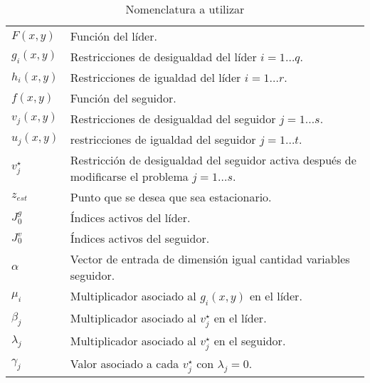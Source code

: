 \begin{table}[H]
    \centering
    \caption{Nomenclatura a utilizar}
    \begin{tabular}{l m{360pt}}
        $F(x,y)$              & Función del líder.                                                                                                          \\
        $ g_i(x,y) $              & Restricciones de desigualdad del líder   $ i=1\ldots q$.                                                                                                        \\
        $ h_i(x,y) $                 & Restricciones de igualdad del líder   $ i=1\ldots r$.                    \\
        $ f(x,y) $           & Función del seguidor.                                                               \\
        $ v_j(x,y) $              &  Restricciones de desigualdad del seguidor $j=1\ldots s$.   \\
        $ u_j(x,y) $     & restricciones de igualdad del seguidor $j=1\ldots t$. \\
        $ v_{j}^{\star} $    & Restricción de desigualdad del seguidor activa después de modificarse el problema   $j=1\ldots s$.          \\
        $z_{est}$         & Punto que se desea que sea estacionario.\\
        $J_0^g$             & Índices activos del líder. \\
        $J_0^v$                & Índices activos del seguidor. \\
        $ \alpha  $             & Vector de entrada de dimensión igual cantidad variables seguidor.                                                                                                      \\
        $\mu_i $                & Multiplicador asociado al $g_i(x,y)$ en el líder.  \\
        $ \beta_j $               & Multiplicador asociado al $v_{j}^{\star}$ en el líder.          \\
        $ \lambda_j $              & Multiplicador asociado al $v_{j}^{\star}$ en el seguidor.\\
        $\gamma_j$                & Valor asociado a cada $v_{j}^{\star}$ con $\lambda_j=0$.\\
    \end{tabular}

    \end{table}

